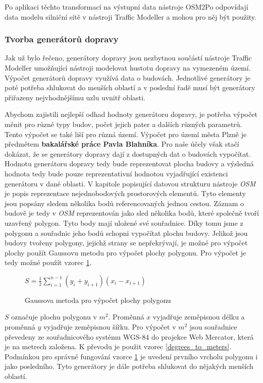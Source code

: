 Po aplikaci těchto transformací na výstupní data nástroje OSM2Po odpovídají data modelu silniční sítě v nástroji Traffic Modeller a mohou pro něj být použity.

\subsubsection{Tvorba generátorů dopravy}
\label{tvorba_generatoru_dopravy}

Jak už bylo řečeno, generátory dopravy jsou nezbytnou součástí nástroje Traffic Modeller umožňující nástroji modelovat hustotu dopravy na vymezeném území. Výpočet generátorů dopravy využívá data o budovách. Jednotlivé generátory je poté potřeba shlukovat do menších oblastí a v poslední řadě musí být generátory přiřazeny nejvhodnějšímu uzlu uvnitř oblasti. 

Abychom zajistili nejlepší odhad hodnoty generátoru dopravy, je potřeba výpočet měnit pro různé typy budov, počet jejich pater a dalších různých parametrů. Tento výpočet se také liší pro různá území. Výpočet pro území města Plzně je předmětem \textbf{bakalářské práce Pavla Blahníka}. Pro naše účely však stačí dokázat, že se generátory dopravy dají z dostupných dat o budovách vypočítat. Hodnotu generátoru dopravy tedy bude reprezentovat plocha budovy a výsledná hodnota tedy bude pouze reprezentativní hodnotou vyjadřující existenci generátoru v dané oblasti. V kapitole popisující datovou strukturu nástroje \textit{OSM} je popis reprezentace nejednobodových prostorových elementů. Tyto elementy jsou popsány sledem několika bodů referencovaných jednou cestou. Záznam o budově je tedy v \textit{OSM} reprezentován jako sled několika bodů, které společně tvoří uzavřený polygon. Tyto body mají uložené své souřadnice. Díky tomu jsme z polygonu a souřadnic jeho bodů schopni vypočítat plochu budovy. Jelikož jsou budovy tvořeny polygony, jejichž strany se nepřekrývají, je možné pro výpočet plochy použít Gaussovu metodu pro výpočet plochy polygonu. Pro výpočet je tedy možné použít vzorec \ref{plocha_polygonu}.

\begin{figure}[htbp]
  \centering
  $\displaystyle S = \frac{1}{2}\sum_{i=1}^{n-1}(y_{i}+y_{i+1})(x_{i}-x_{i+1})$
  \caption{Gaussova metoda pro výpočet plochy polygonu}
  \label{plocha_polygonu}
\end{figure}

$S$ označuje plochu polygonu v $m^2$. Proměnná $x$ vyjadřuje zeměpisnou délku a proměnná $y$ vyjadřuje zeměpisnou šířku. Pro výpočet v $m^2$ jsou souřadnice převedeny ze souřadnicového systému WGS-84 do projekce Web Mercator, která je na metrech založena. K převodu je použit vzorec \ref{degrees_to_meters}. Podmínkou pro správné fungování vzorce \ref{plocha_polygonu} je uvedení prvního vrcholu polygonu i jako posledního. Tyto generátory je dále potřeba shlukovat do nějakých menších oblastí. 

